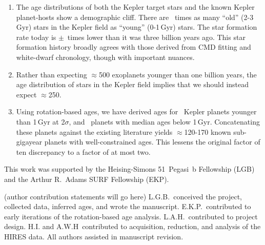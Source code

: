\documentclass[11pt,twocolumn,tighten]{aastex63}
\begin{document}
\begin{enumerate}[leftmargin=*,topsep=0pt,itemsep=-1ex,partopsep=1ex,parsep=1ex]
  \item The age distributions of both the Kepler target stars and the
    known Kepler planet-hosts show a demographic cliff.  There are
    \ratioobtoybstars\ times as many ``old'' (2-3\,Gyr) stars in the
    Kepler field as ``young'' (0-1\,Gyr) stars.  The star formation
    rate today is \ratiosfr$\pm$\uncratiosfr\ times lower than it was
    three billion years ago.
    This star formation history broadly agrees with those derived
    from CMD fitting and white-dwarf chronology, though with
    important nuances.
  \item Rather than expecting $\approx$500 exoplanets younger than one
    billion years, the age distribution of stars in the
    Kepler field implies that we should instead expect $\approx$250.
  \item Using rotation-based ages, we have derived ages for
    \nplyounggyrotwosigma\ Kepler planets younger than 1\,Gyr at 2$\sigma$,
    and \nplyounggyro\ planets with median ages below 1\,Gyr.
    Concatenating these planets against the existing literature yields
    $\approx$120-170 known sub-gigayear planets with well-constrained
    ages.  This lessens the original factor of ten discrepancy to
    a factor of at most two.
\end{enumerate}


\acknowledgements
This work was supported by the Heising-Simons 51~Pegasi~b Fellowship
(LGB)
and the Arthur R.~Adams SURF Fellowship (EKP).

(author contribution statements will go here)
L.G.B.~conceived the project, collected data, 
inferred ages, and wrote the manuscript.
E.K.P.~contributed to early iterations of the rotation-based age analysis.
L.A.H.~contributed to project design.
H.I. and A.W.H~contributed to acquisition, reduction, and analysis of
the HIRES data.
All authors assisted in manuscript revision.




\clearpage 
\end{document}
